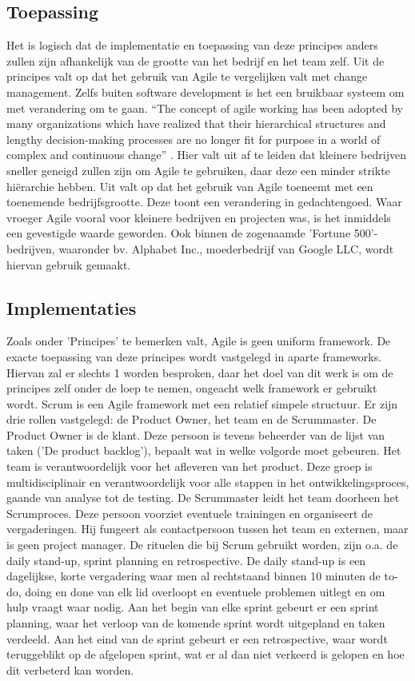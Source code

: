 \subsection{Toepassing}
Het is logisch dat de implementatie en toepassing van deze principes anders zullen zijn afhankelijk van de grootte van het bedrijf en het team zelf. Uit de principes valt op dat het gebruik van Agile te vergelijken valt met change management. Zelfs buiten software development is het een bruikbaar systeem om met verandering om te gaan. 
``The concept of agile working has been adopted by many organizations which have realized that their hierarchical structures and lengthy decision-making processes are no longer fit for purpose in a world of complex and continuous change'' \autocite{Franklin2014}. Hier valt uit af te leiden dat kleinere bedrijven sneller geneigd zullen zijn om Agile te gebruiken, daar deze een minder strikte hiërarchie hebben. Uit \textcite{Salo2008} valt op dat het gebruik van Agile toeneemt met een toenemende bedrijfsgrootte. Deze toont een verandering in gedachtengoed. Waar vroeger Agile vooral voor kleinere bedrijven en projecten was, is het inmiddels een gevestigde waarde geworden. Ook binnen de zogenaamde 'Fortune 500'-bedrijven, waaronder bv. Alphabet Inc., moederbedrijf van Google LLC, wordt hiervan gebruik gemaakt. 

\subsection{Implementaties}
Zoals onder 'Principes' te bemerken valt, Agile is geen uniform framework. De exacte toepassing van deze principes wordt vastgelegd in aparte frameworks. Hiervan zal er slechts 1 worden besproken, daar het doel van dit werk is om de principes zelf onder de loep te nemen, ongeacht welk framework er gebruikt wordt.
Scrum is een Agile framework met een relatief simpele structuur. Er zijn drie rollen vastgelegd: de Product Owner, het team en de Scrummaster. De Product Owner is de klant. Deze persoon is tevens beheerder van de lijst van taken ('De product backlog'), bepaalt wat in welke volgorde moet gebeuren. Het team is verantwoordelijk voor het afleveren van het product. Deze groep is multidisciplinair en verantwoordelijk voor alle stappen in het ontwikkelingsproces, gaande van analyse tot de testing. De Scrummaster leidt het team doorheen het Scrumproces. Deze persoon voorziet eventuele trainingen en organiseert de vergaderingen. Hij fungeert als contactpersoon tussen het team en externen, maar is geen project manager.
De rituelen die bij Scrum gebruikt worden, zijn o.a. de daily stand-up, sprint planning en retrospective. De daily stand-up is een dagelijkse, korte vergadering waar men al rechtstaand binnen 10 minuten de to-do, doing en done van elk lid overloopt en eventuele problemen uitlegt en om hulp vraagt waar nodig. Aan het begin van elke sprint gebeurt er een sprint planning, waar het verloop van de komende sprint wordt uitgepland en taken verdeeld. Aan het eind van de sprint gebeurt er een retrospective, waar wordt teruggeblikt op de afgelopen sprint, wat er al dan niet verkeerd is gelopen en hoe dit verbeterd kan worden.


